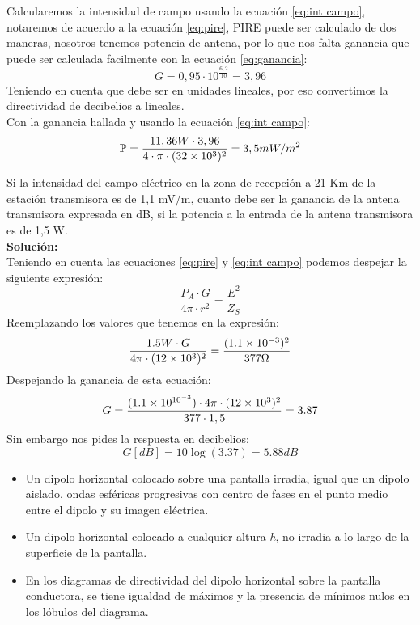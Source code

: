 \documentclass[
	12pt, %
	fleqn, %
	a4paper, %
	oneside, %
]{LegrandOrangeBook}
\begin{document}
\begin{example}
Calcularemos la intensidad de campo usando la ecuación \ref{eq:int campo}, notaremos de acuerdo a la ecuación \ref{eq:pire}, PIRE puede ser calculado de dos maneras, nosotros tenemos potencia de antena, por lo que nos falta ganancia que puede ser calculada facilmente con la ecuación  \ref{eq:ganancia}:
\begin{displaymath}
G=0,95\cdot 10^{\frac{6,2}{10}}=3,96
\end{displaymath}
Teniendo en cuenta que debe ser en unidades lineales, por eso convertimos la directividad de decibelios a lineales.\\
Con la ganancia hallada y usando la ecuación \ref{eq:int campo}:
\begin{displaymath}
\mathbb{P}=\frac{11,36 W\cdot 3,96}{4\cdot\pi\cdot(32\times 10^{3})^2}=3,5 mW/m^2
\end{displaymath}
\end{example}
\begin{example}
Si la intensidad del campo eléctrico en la zona de recepción a 21 Km de la estación transmisora es de 1,1 mV/m, cuanto debe ser la ganancia de la antena transmisora expresada en dB, si la potencia a la entrada de la antena transmisora es de 1,5 W.\\
\textbf{Solución:}\\
Teniendo en cuenta las ecuaciones \ref{eq:pire} y \ref{eq:int campo} podemos despejar la siguiente expresión:
\begin{displaymath}
\frac{P_A\cdot G}{4\pi\cdot r^2}=\frac{E^2}{Z_S}
\end{displaymath}
Reemplazando los valores que tenemos en la expresión:
\begin{displaymath}
\frac{1.5 W\cdot G}{4\pi\cdot (12\times 10^{3})^2}=\frac{(1.1\times 10^{-3})^2}{377 \Omega}
\end{displaymath}
Despejando la ganancia de esta ecuación:
\begin{displaymath}
G=\frac{(1.1\times 10^{10^{-3}})\cdot 4\pi\cdot (12\times 10^{3})^2}{377\cdot 1,5}=3.87
\end{displaymath}
Sin embargo nos pides la respuesta en decibelios:
\begin{displaymath}
G[dB]=10\log(3.37)=5.88 dB
\end{displaymath}
\end{example}
\begin{corollary}
\begin{itemize}
\item Un dipolo horizontal colocado sobre una pantalla irradia, igual que un dipolo aislado, ondas esféricas progresivas con centro de fases en el punto medio entre el dipolo y su imagen eléctrica.
\item Un dipolo horizontal colocado a cualquier altura \textit{h}, no irradia a lo largo de la superficie de la pantalla.
\item En los diagramas de directividad del dipolo horizontal sobre la pantalla conductora, se tiene igualdad de máximos y la presencia de mínimos nulos en los lóbulos del diagrama.
\end{itemize}
\end{corollary}
\end{document}
